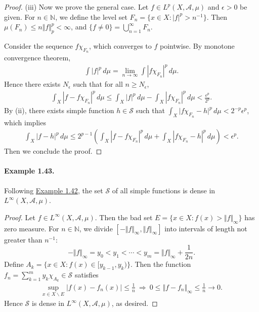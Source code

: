\documentclass{article}
\begin{document}
\begin{proof}
(iii) Now we prove the general case. Let $f\in L^p(X,\mathscr{A},\mu)$ and $\epsilon > 0$ be given. For $n\in\mathbb{N}$, we define the level set $F_n = \{x\in X:\vert f\vert^p > n^{-1}\}$. Then $\mu(F_n)\leq n\Vert f\Vert_p^p<\infty$, and $\{f\neq 0\}=\bigcup_{n=1}^\infty F_n$.

Consider the sequence $f\chi_{F_n}$, which converges to $f$ pointwise. By monotone convergence theorem,
\begin{align*}
	\int\vert f\vert^p\,d\mu = \lim_{n\to\infty}\int \left\vert f\chi_{F_n}\right\vert^p\,d\mu.
\end{align*}
Hence there exists $N_\epsilon$ such that for all $n\geq N_\epsilon$,
\begin{align*}
	\int_X\left\vert f - f\chi_{F_n}\right\vert^p\,d\mu \leq \int_X\left\vert f \right\vert^p\,d\mu - \int_X\left\vert f\chi_{F_n}\right\vert^p\,d\mu < \frac{\epsilon^p}{2^{p}}.
\end{align*}
By (ii), there exists simple function $h\in\mathcal{S}$ such that $\int_X\vert f\chi_{F_n} - h\vert^p\,d\mu < 2^{-p}\epsilon^p$, which implies
\begin{align*}
	\int_X\vert f - h\vert^p\,d\mu \leq 2^{p-1}\left(\int_X\left\vert f - f\chi_{F_n}\right\vert^p\,d\mu + \int_X\left\vert f\chi_{F_n} - h\right\vert^p\,d\mu\right) < \epsilon^p.
\end{align*}
Then we conclude the proof.
\end{proof}

\paragraph{Example 1.43.\label{example:1.43}} Following \hyperref[example:1.42]{Example 1.42}, the set $\mathcal{S}$ of all simple functions is dense in $L^\infty(X,\mathscr{A},\mu)$.
\begin{proof}
Let $f\in L^\infty(X,\mathscr{A},\mu)$. Then the bad set $E=\{x\in X:f(x)>\Vert f\Vert_\infty\}$ has zero measure. For $n\in\mathbb{N}$, we divide $[-\Vert f\Vert_\infty,\Vert f\Vert_\infty]$ into intervals of length not greater than $n^{-1}$:
$$-\Vert f\Vert_\infty = y_0 < y_1 < \cdots < y_m = \Vert f\Vert_\infty + \frac{1}{2n}.$$
Define $A_k=\{x\in X:f(x)\in[y_{k-1},y_k)\}$. Then the function $f_n=\sum_{k=1}^m y_k\chi_{A_k}\in\mathcal{S}$ satisfies
\begin{align*}
	\sup_{x\in X\backslash E}\vert f(x) - f_n(x)\vert \leq \frac{1}{n}\ \Rightarrow\ 0\leq \Vert f-f_n\Vert_\infty\leq\frac{1}{n}\to 0.
\end{align*}
Hence $\mathcal{S}$ is dense in $L^\infty(X,\mathscr{A},\mu)$, as desired.
\end{proof}
\end{document}
